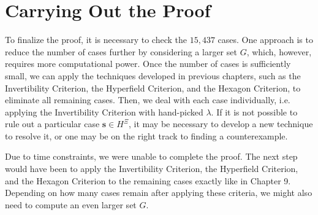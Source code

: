 \section{Carrying Out the Proof}

To finalize the proof, it is necessary to check the \( 15,437 \) cases. 
One approach is to reduce the number of cases further by considering a larger set \( G \), 
which, however, requires more computational power. 
Once the number of cases is sufficiently small, we can apply the techniques developed in previous chapters, 
such as the Invertibility Criterion, the Hyperfield Criterion, and the Hexagon Criterion, to eliminate all remaining cases. Then, we deal with each case individually, i.e. applying the Invertibility Criterion with hand-picked \( \lambda \).
If it is not possible to rule out a particular case \( \mathbf{s} \in H^{\Xi} \), 
it may be necessary to develop a new technique to resolve it, or one may be on the right track to finding a counterexample.

Due to time constraints, we were unable to complete the proof. 
The next step would have been to apply the Invertibility Criterion, the Hyperfield Criterion, 
and the Hexagon Criterion to the remaining cases exactly like in Chapter 9.
Depending on how many cases remain after applying these criteria, 
we might also need to compute an even larger set \( G \). 